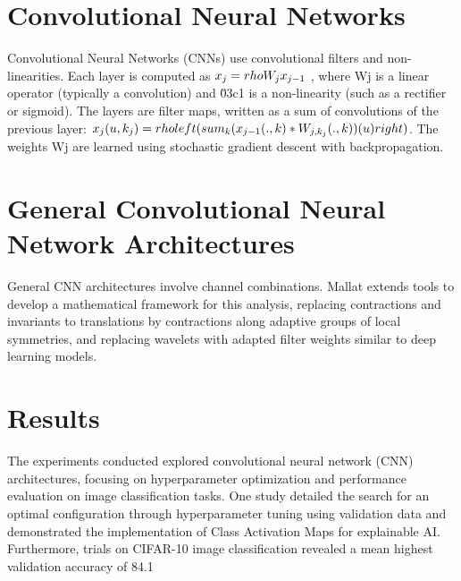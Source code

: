\documentclass{article}
\begin{document}
\section*{Convolutional Neural Networks}

Convolutional Neural Networks (CNNs) use convolutional filters and non-linearities. Each layer is computed as  $x_j = \\rho W_j x_{j-1}$ , where Wj is a linear operator (typically a convolution) and \u03c1 is a non-linearity (such as a rectifier or sigmoid). The layers are filter maps, written as a sum of convolutions of the previous layer: $x_j(u, k_j) = \\rho \\left( \\sum_k (x_{j-1}(., k) * W_{j,k_j}(., k))(u) \\right)$. The weights Wj are learned using stochastic gradient descent with backpropagation.

\section*{General Convolutional Neural Network Architectures}

General CNN architectures involve channel combinations. Mallat extends tools to develop a mathematical framework for this analysis, replacing contractions and invariants to translations by contractions along adaptive groups of local symmetries, and replacing wavelets with adapted filter weights similar to deep learning models.


\section*{Results}
The experiments conducted explored convolutional neural network (CNN) architectures, focusing on hyperparameter optimization and performance evaluation on image classification tasks. One study detailed the search for an optimal configuration through hyperparameter tuning using validation data and demonstrated the implementation of Class Activation Maps for explainable AI.  Furthermore, trials on CIFAR-10 image classification revealed a mean highest validation accuracy of 84.1%
\end{document}
